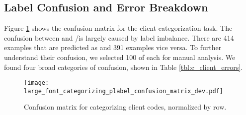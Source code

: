 \subsection{Label Confusion and Error Breakdown}
\label{ssec:label_confusion}


Figure \ref{fig:categorizing_confusion_client} shows the confusion
matrix for the client categorization task. The confusion between \FN
and \CHANGE/\SUSTAIN is largely caused by label imbalance. There are 414 \CHANGE examples that are predicted as \SUSTAIN
and 391 examples vice versa. To further understand their confusion, we
selected 100 of each for manual analysis. We found four broad
categories of confusion, shown in Table
\ref{tbl:c_client_errors}.

\begin{figure}[!h]
\centering
  \texttt{[image: large\_font\_categorizing\_plabel\_confusion\_matrix\_dev.pdf]}
  \caption{\label{fig:categorizing_confusion_client} Confusion matrix for categorizing client codes, normalized by row.}
\end{figure}


